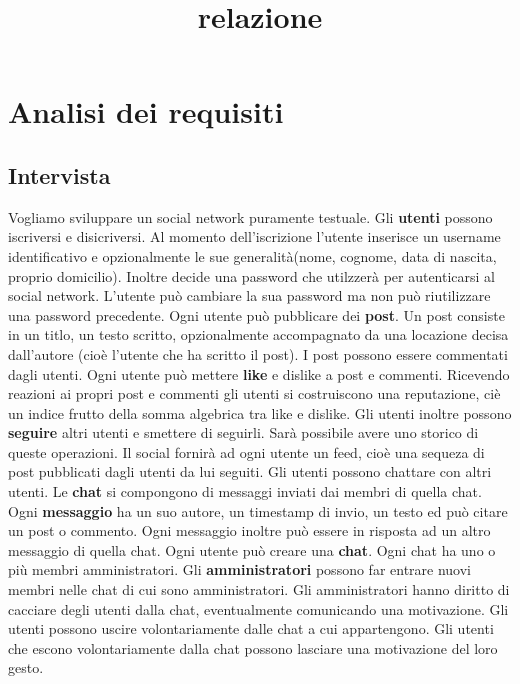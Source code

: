 \documentclass[a4paper,12pt]{report}
\begin{document}
\tableofcontents

\title{relazione}

\chapter{Analisi dei requisiti}
\section{Intervista}
Vogliamo sviluppare un social network puramente testuale.
Gli \textbf{utenti} possono iscriversi e disicriversi. Al momento dell'iscrizione l'utente inserisce un username identificativo e opzionalmente le sue generalità(nome, cognome, data di nascita, proprio domicilio). Inoltre decide una password che utilzzerà per autenticarsi al social network.
L'utente può cambiare la sua password ma non può riutilizzare una password precedente.
Ogni utente può pubblicare dei \textbf{post}. Un post consiste in un titlo, un testo scritto, opzionalmente accompagnato da una locazione decisa dall'autore (cioè l'utente che ha scritto il post). I post possono essere commentati dagli utenti.
Ogni utente può mettere \textbf{like} e dislike a post e commenti. Ricevendo reazioni ai propri post e commenti gli utenti si costruiscono una reputazione, ciè un indice frutto della somma algebrica tra like e dislike.
Gli utenti inoltre possono \textbf{seguire} altri utenti e smettere di seguirli. Sarà possibile avere uno storico di queste operazioni. 
Il social fornirà ad ogni utente un feed, cioè una sequeza di post pubblicati dagli utenti da lui seguiti.
Gli utenti possono chattare con altri utenti. Le \textbf{chat} si compongono di messaggi inviati dai membri di quella chat. Ogni \textbf{messaggio} ha un suo autore, un timestamp di invio, un testo ed può citare un post o commento. Ogni messaggio inoltre può essere in risposta ad un altro messaggio di quella chat. 
Ogni utente può creare una \textbf{chat}. Ogni chat ha uno o più membri amministratori. Gli \textbf{amministratori} possono far entrare nuovi membri nelle chat di cui sono amministratori. Gli amministratori hanno diritto di cacciare degli utenti dalla chat, eventualmente comunicando una motivazione. Gli utenti possono uscire volontariamente dalle chat a cui appartengono. Gli utenti che escono volontariamente dalla chat possono lasciare una motivazione del loro gesto. 
\end{document}
